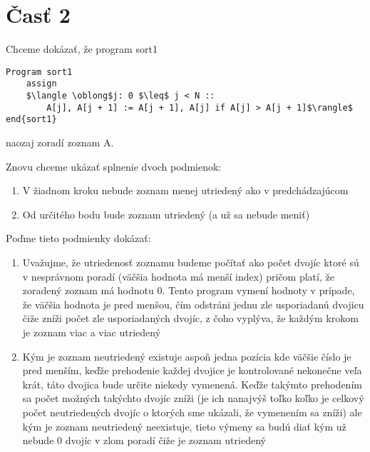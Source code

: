 \documentclass[a4paper]{article}
\begin{document}
\newpage
\section{Časť 2}

Chceme dokázať, že program sort1 
\begin{lstlisting}
Program sort1
	assign
	$\langle \oblong$j: 0 $\leq$ j < N ::
		A[j], A[j + 1] := A[j + 1], A[j] if A[j] > A[j + 1]$\rangle$
end{sort1}
\end{lstlisting}
naozaj zoradí zoznam A.

Znovu chceme ukázať splnenie dvoch podmienok:
\begin{enumerate}
	\item V žiadnom kroku nebude zoznam menej utriedený ako v predchádzajúcom
	\item Od určitého bodu bude zoznam utriedený (a už sa nebude meniť)
\end{enumerate}

Poďme tieto podmienky dokázať:
\begin{enumerate}
	\item Uvažujme, že utriedenosť zoznamu budeme počítať ako počet dvojíc ktoré sú v nesprávnom poradí (väčšia hodnota má menší index) pričom platí, že zoradený zoznam má hodnotu 0. Tento program vymení hodnoty v prípade, že väčšia hodnota je pred menšou, čím odstráni jednu zle usporiadanú dvojicu čiže zníži počet zle usporiadaných dvojíc, z čoho vyplýva, že každým krokom je zoznam viac a viac utriedený
	\item Kým je zoznam neutriedený existuje aspoň jedna pozícia kde väčšie číslo je pred menším, keďže prehodenie každej dvojice je kontrolované nekonečne veľa krát, táto dvojica bude určite niekedy vymenená. Keďže takýmto prehodením sa počet možných takýchto dvojíc zníži (je ich nanajvýš toľko koľko je celkový počet neutriedených dvojíc o ktorých sme ukázali, že vymenením sa zníži) ale kým je zoznam neutriedený neexistuje, tieto výmeny sa budú diať kým už nebude 0 dvojíc v zlom poradí čiže je zoznam utriedený  
\end{enumerate}
\end{document}
